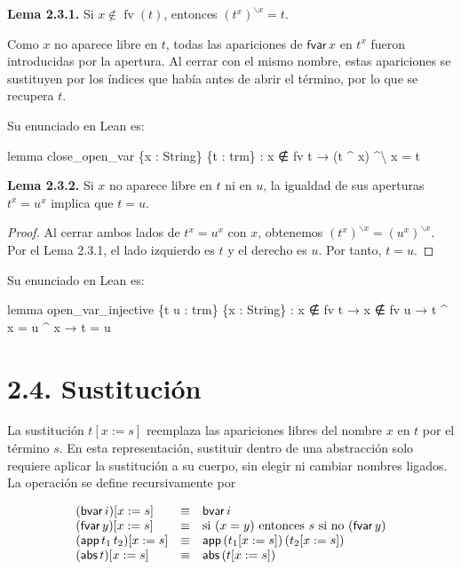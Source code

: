 \documentclass[
  spanish,
  letterpaper,
  DIV=11,
  numbers=noendperiod]{scrreprt}
\newenvironment{Shaded}{\begin{snugshade}}{\end{snugshade}}
\newcommand{\KeywordTok}[1]{\textcolor[rgb]{0.00,0.23,0.31}{\textbf{#1}}}
\newcommand{\NormalTok}[1]{\textcolor[rgb]{0.00,0.23,0.31}{#1}}
\renewcommand{\NormalTok}[1]{\textcolor[HTML]{000000}{#1}}
\renewcommand{\KeywordTok}[1]{\textcolor[HTML]{0000FF}{#1}}
\theoremstyle{remark}
\begin{document}
\textbf{Lema 2.3.1.} Si \(x\notin\operatorname{fv}(t)\), entonces
\((t^x)^{\backslash x}=t\).

Como \(x\) no aparece libre en \(t\), todas las apariciones de
\(\mathsf{fvar}\,x\) en \(t^x\) fueron introducidas por la apertura. Al
cerrar con el mismo nombre, estas apariciones se sustituyen por los
índices que había antes de abrir el término, por lo que se recupera
\(t\).

Su enunciado en Lean es:

\begin{Shaded}
\begin{Highlighting}[]
\KeywordTok{lemma}\NormalTok{ close\_open\_var \{x : String\} \{t : trm\} :}
\NormalTok{    x ∉ fv t →}
\NormalTok{    (t \^{} x) \^{}\textbackslash{} x = t}
\end{Highlighting}
\end{Shaded}

\textbf{Lema 2.3.2.} Si \(x\) no aparece libre en \(t\) ni en \(u\), la
igualdad de sus aperturas \(t^x=u^x\) implica que \(t=u\).

\begin{proof}
Al cerrar ambos lados de \(t^x=u^x\) con \(x\), obtenemos
\((t^x)^{\backslash x}=(u^x)^{\backslash x}\). Por el Lema 2.3.1, el
lado izquierdo es \(t\) y el derecho es \(u\). Por tanto, \(t=u\).
\end{proof}

Su enunciado en Lean es:

\begin{Shaded}
\begin{Highlighting}[]
\KeywordTok{lemma}\NormalTok{ open\_var\_injective \{t u : trm\} \{x : String\} :}
\NormalTok{    x ∉ fv t →}
\NormalTok{    x ∉ fv u →}
\NormalTok{    t \^{} x = u \^{} x →}
\NormalTok{    t = u }
\end{Highlighting}
\end{Shaded}

\section{2.4. Sustitución}\label{sustituciuxf3n}

La sustitución \(t[x:=s]\) reemplaza las apariciones libres del nombre
\(x\) en \(t\) por el término \(s\). En esta representación, sustituir
dentro de una abstracción solo requiere aplicar la sustitución a su
cuerpo, sin elegir ni cambiar nombres ligados. La operación se define
recursivamente por

\[
\begin{array}{l c l}
(\mathsf{bvar}\,i)[x:=s]
  & \equiv & \mathsf{bvar}\,i \\
(\mathsf{fvar}\,y)[x:=s]
  & \equiv &
  \text{si } (x=y) \text{ entonces } s
  \text{ si no } (\mathsf{fvar}\,y) \\
(\mathsf{app}\,t_1\,t_2)[x:=s]
  & \equiv &
  \mathsf{app}\,(t_1[x:=s])\,(t_2[x:=s]) \\
(\mathsf{abs}\,t)[x:=s]
  & \equiv &
  \mathsf{abs}\,(t[x:=s])
\end{array}
\]
\end{document}
